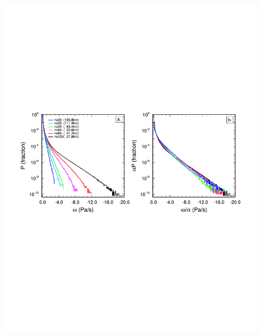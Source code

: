 {\begin{figure}[t]
\begin{center}
\noindent\includegraphics[width=35pc,angle=0]{chapter6/temp_2pdf.pdf}\\
\end{center}
\caption{}
\label{fig:2pdf}
\end{figure}

}

